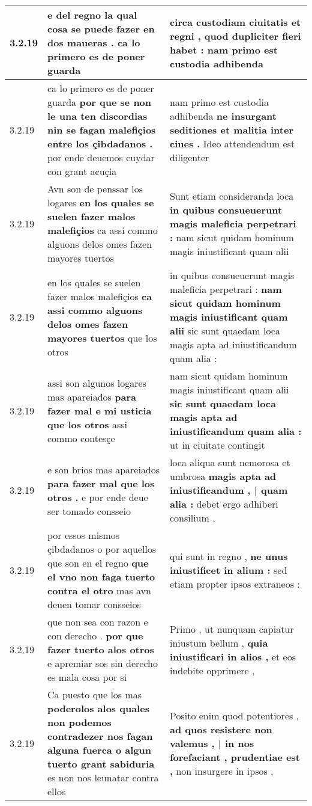 \begin{tabular}{|p{1cm}|p{6.5cm}|p{6.5cm}|}
3.2.19 & e del regno \textbf{ la qual cosa se puede fazer en dos maueras . } ca lo primero es de poner guarda & circa custodiam ciuitatis et regni , \textbf{ quod dupliciter fieri habet : } nam primo est custodia adhibenda \\\hline
3.2.19 & ca lo primero es de poner guarda \textbf{ por que se non le una ten discordias nin se fagan malefiçios entre los çibdadanos . } por ende deuemos cuydar con grant acuçia & nam primo est custodia adhibenda \textbf{ ne insurgant seditiones et malitia inter ciues . } Ideo attendendum est diligenter \\\hline
3.2.19 & Avn son de penssar los logares \textbf{ en los quales se suelen fazer malos malefiçios } ca assi commo alguons delos omes fazen mayores tuertos & Sunt etiam consideranda loca \textbf{ in quibus consueuerunt magis maleficia perpetrari : } nam sicut quidam hominum magis iniustificant quam alii \\\hline
3.2.19 & en los quales se suelen fazer malos malefiçios \textbf{ ca assi commo alguons delos omes fazen mayores tuertos } que los otros & in quibus consueuerunt magis maleficia perpetrari : \textbf{ nam sicut quidam hominum magis iniustificant quam alii } sic sunt quaedam loca magis apta ad iniustificandum quam alia : \\\hline
3.2.19 & assi son algunos logares mas apareiados \textbf{ para fazer mal e mi usticia que los otros } assi commo contesçe & nam sicut quidam hominum magis iniustificant quam alii \textbf{ sic sunt quaedam loca magis apta ad iniustificandum quam alia : } ut in ciuitate contingit \\\hline
3.2.19 & e son brios mas apareiados \textbf{ para fazer mal que los otros . } e por ende deue ser tomado consseio & loca aliqua sunt nemorosa et umbrosa \textbf{ magis apta ad iniustificandum , | quam alia : } debet ergo adhiberi consilium , \\\hline
3.2.19 & por essos mismos çibdadanos o por aquellos que son en el regno \textbf{ que el vno non faga tuerto contra el otro } mas avn deuen tomar consseios & qui sunt in regno , \textbf{ ne unus iniustificet in alium : } sed etiam propter ipsos extraneos : \\\hline
3.2.19 & que non sea con razon e con derecho . \textbf{ por que fazer tuerto alos otros } e apremiar sos sin derecho es mala cosa por si & Primo , ut nunquam capiatur iniustum bellum , \textbf{ quia iniustificari in alios , } et eos indebite opprimere , \\\hline
3.2.19 & Ca puesto que los mas \textbf{ poderolos alos quales non podemos contradezer nos fagan alguna fuerca o algun tuerto grant sabiduria } es non nos leunatar contra ellos & Posito enim quod potentiores , \textbf{ ad quos resistere non valemus , | in nos forefaciant , prudentiae est , } non insurgere in ipsos , \\\hline

\end{tabular}
